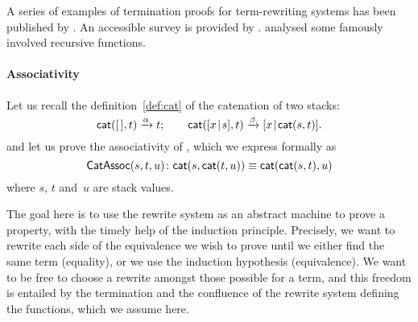 A series of examples of termination proofs for term\hyp{}rewriting systems has been
published by \cite{Dershowitz_1995,ArtsGiesl_2001}. An accessible
survey is provided by \cite{Dershowitz_1987}. \cite{Knuth_2000a}
analysed some famously involved recursive functions.

\paragraph{Associativity}
\label{proof:assoc_cat}

Let us recall the definition~\eqref{def:cat} of the catenation of two
stacks:
\begin{equation*}
\fun{cat}(        \el,t) \xrightarrow{\smash{\alpha}} t;\qquad
\fun{cat}(\cons{x}{s},t) \xrightarrow{\smash{\beta}}
\cons{x}{\fun{cat}(s,t)}.
\index{stack!catenation!definition}
\end{equation*}
and let us prove the
associativity
 of , which
we express formally as
\begin{equation*}
  \pred{CatAssoc}{s,t,u} \colon
\fun{cat}(s,\fun{cat}(t,u)) \equiv
\fun{cat}(\fun{cat}(s,t),u)
\index{CatAssoc@\predName{CatAssoc}|(}
\end{equation*}
where \(s\), \(t\) and~\(u\) are stack values.

The goal here is to use the rewrite system as an abstract machine to
prove a property, with the timely help of the induction
principle. Precisely, we want to rewrite each side of the equivalence
we wish to prove until we either find the same term (equality), or we
use the induction hypothesis (equivalence). We want to be free to
choose a rewrite amongst those possible for a term, and this freedom
is entailed by the termination and the confluence of the rewrite
system defining the functions, which we assume here.

